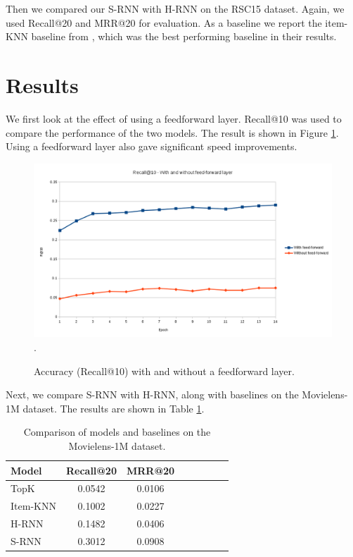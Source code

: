 Then we compared our S-RNN with H-RNN on the RSC15 dataset. Again, we used Recall@20 and MRR@20 for evaluation. As a baseline we report the item-KNN baseline from \cite{DBLP:journals/corr/HidasiKBT15}, which was the best performing baseline in their results.

\section{Results}

We first look at the effect of using a feedforward layer. Recall@10 was used to compare the performance of the two models. The result is shown in Figure \ref{fig:ff-vs-non-ff}. Using a feedforward layer also gave significant speed improvements.

\begin{figure}[htp]
	\centering
	\includegraphics[width=1.0\textwidth]{fig/ff_vs_non-ff_chart.png}.
	\caption{Accuracy (Recall@10) with and without a feedforward layer.}
	\label{fig:ff-vs-non-ff}
\end{figure}

Next, we compare S-RNN with H-RNN, along with baselines on the Movielens-1M dataset. The results are shown in Table \ref{table:movlen-comp}.

\begin{table}
	\centering
	\begin{tabular}{l*{6}{c}r}
		Model			& Recall@20	& MRR@20 \\
		\hline
		TopK			& 0.0542	& 0.0106 \\
		Item-KNN		& 0.1002	& 0.0227 \\
		H-RNN			& 0.1482	& 0.0406 \\
		S-RNN			& 0.3012	& 0.0908 \\
	\end{tabular}
	\caption{Comparison of models and baselines on the Movielens-1M dataset.}
	\label{table:movlen-comp}
\end{table}

